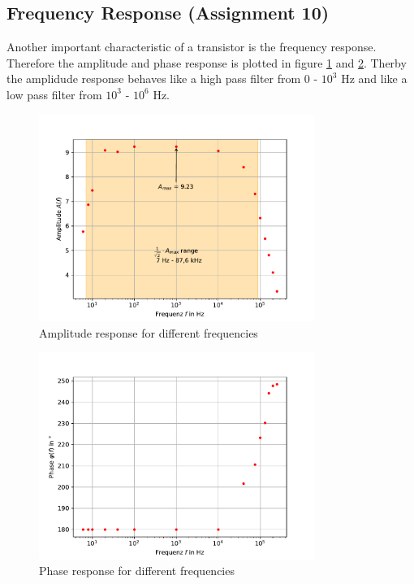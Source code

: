 \documentclass[11pt, a4paper]{article}
\begin{document}
\subsection{Frequency Response (Assignment 10)}
Another important characteristic of a transistor is the frequency response. Therefore the amplitude and phase response is plotted in figure \ref{fig:Ampresp} and \ref{fig:Pharesp}.
Therby the amplidude response behaves like a high pass filter from 0 - $10^3$ \si{\hertz} and like a low pass filter from $10^3$ - $10^6$ \si{\hertz}. 


\begin{figure}[h]
    \centering
    \includegraphics[width=0.8\textwidth]{plots/Amplitudengang.pdf}
    \caption{Amplitude response for different frequencies}
    \label{fig:Ampresp}
\end{figure}

\begin{figure}[h]
    \centering
    \includegraphics[width=0.8\textwidth]{plots/Phasengang.pdf}
    \caption{Phase response for different frequencies}
    \label{fig:Pharesp}
\end{figure}




\end{document}
